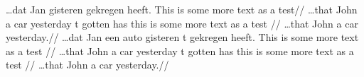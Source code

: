 \documentclass{article}
\begin{document}
\pex
\a
\begingl[aboveglbskip=1.2\arrowheight]
\gla        \ldots dat Jan  gisteren    gekregen heeft. This is some more  text as a test//
\glb        \ldots that John {a\hspace*{1em} car}  yesterday t  gotten has this is some more text as a test //
\glft       \ldots that John a car yesterday.//
\endgl
\a\begingl
\gla        \ldots dat Jan een auto gisteren t gekregen heeft. This is some more text as a test //
\glb        \ldots that John a car  yesterday t gotten has this is some more text as a test //
\glft       \ldots that John a car yesterday.//
\endgl
\xe
{}
\end{document}
